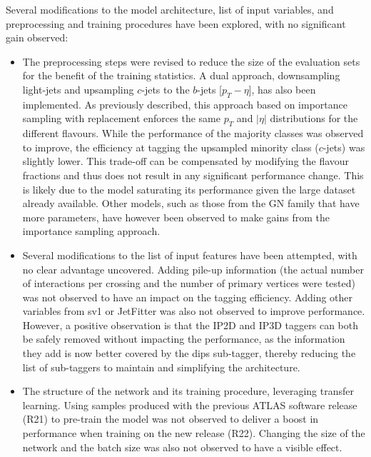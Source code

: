 Several modifications to the model architecture, list of input variables, and preprocessing and training procedures have been explored, with no significant gain observed:
\begin{itemize}
\item The preprocessing steps were revised to reduce the size of the evaluation sets for the benefit of the training statistics. A dual approach, downsampling light-jets and upsampling $c$-jets to the $b$-jets [$p_T - \eta$], has also been implemented. As previously described, this approach based on importance sampling with replacement enforces the same $p_T$ and $|\eta|$ distributions for the different flavours. While the performance of the majority classes was observed to improve, the efficiency at tagging the upsampled minority class ($c$-jets) was slightly lower. This trade-off can be compensated by modifying the flavour fractions and thus does not result in any significant performance change. This is likely due to the model saturating its performance given the large dataset already available. Other models, such as those from the GN family that have more parameters, have however been observed to make gains from the importance sampling approach.
\item Several modifications to the list of input features have been attempted, with no clear advantage uncovered. Adding pile-up information (the actual number of interactions per crossing and the number of primary vertices were tested) was not observed to have an impact on the tagging efficiency. Adding other variables from \gls{sv1} or JetFitter was also not observed to improve performance. However, a positive observation is that the IP2D and IP3D taggers can both be safely removed without impacting the performance, as the information they add is now better covered by the \gls{dips} sub-tagger, thereby reducing the list of sub-taggers to maintain and simplifying the architecture.
\item The structure of the network and its training procedure, leveraging transfer learning. Using samples produced with the previous ATLAS software release (R21) to pre-train the model was not observed to deliver a boost in performance when training on the new release (R22). Changing the size of the network and the batch size was also not observed to have a visible effect.
\end{itemize}

